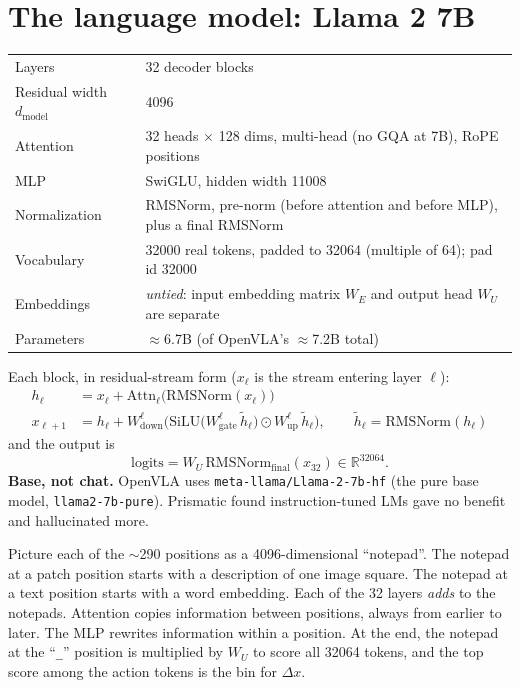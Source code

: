 \documentclass[11pt]{article}
\newcommand{\dm}{d_{\text{model}}}
\begin{document}
\section{The language model: Llama 2 7B}

\begin{center}
\begin{tabularx}{\linewidth}{@{}lX@{}}
\toprule
Layers & 32 decoder blocks \\
Residual width $\dm$ & 4096 \\
Attention & 32 heads $\times$ 128 dims, multi-head (no GQA at 7B), RoPE positions \\
MLP & SwiGLU, hidden width 11008 \\
Normalization & RMSNorm, pre-norm (before attention and before MLP), plus a final RMSNorm \\
Vocabulary & 32000 real tokens, padded to 32064 (multiple of 64); pad id 32000 \\
Embeddings & \emph{untied}: input embedding matrix $W_E$ and output head $W_U$ are separate \\
Parameters & $\approx$6.7B (of OpenVLA's $\approx$7.2B total) \\
\bottomrule
\end{tabularx}
\end{center}

Each block, in residual-stream form ($x_\ell$ is the stream entering layer $\ell$):
\begin{align}
h_\ell &= x_\ell + \mathrm{Attn}_\ell\big(\mathrm{RMSNorm}(x_\ell)\big)\\
x_{\ell+1} &= h_\ell + W^{\ell}_{\text{down}}\Big(\mathrm{SiLU}\big(W^{\ell}_{\text{gate}}\,\tilde h_\ell\big)\odot W^{\ell}_{\text{up}}\,\tilde h_\ell\Big),\qquad \tilde h_\ell=\mathrm{RMSNorm}(h_\ell)
\end{align}
and the output is
\begin{equation}
\text{logits} = W_U\,\mathrm{RMSNorm}_{\text{final}}(x_{32}) \in \mathbb{R}^{32064}.
\end{equation}
\textbf{Base, not chat.} OpenVLA uses \texttt{meta-llama/Llama-2-7b-hf} (the pure base model, \texttt{llama2-7b-pure}). Prismatic found instruction-tuned LMs gave no benefit and hallucinated more.

\begin{mental}
Picture each of the $\sim$290 positions as a 4096-dimensional ``notepad''. The notepad at a patch position starts with a description of one image square. The notepad at a text position starts with a word embedding. Each of the 32 layers \emph{adds} to the notepads. Attention copies information between positions, always from earlier to later. The MLP rewrites information within a position. At the end, the notepad at the ``\texttt{\_}'' position is multiplied by $W_U$ to score all 32064 tokens, and the top score among the action tokens is the bin for $\Delta x$.
\end{mental}
\end{document}
